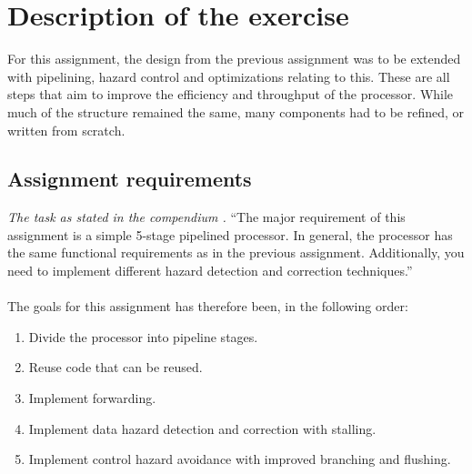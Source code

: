 \section{Description of the exercise}

For this assignment, the design from the previous assignment was to be extended
 with pipelining, hazard control and optimizations relating to this. These are all
 steps that aim to improve the efficiency and throughput of the processor. While
 much of the structure remained the same, many components had to be refined,
 or written from scratch.

\subsection{Assignment requirements}
\emph{The task as stated in the compendium \cite{compendium}.}\newline
``The major requirement of this assignment is a simple 5-stage pipelined
processor. In general, the processor has the same functional requirements as in
the previous assignment. Additionally, you need to implement different hazard
detection and correction techniques.''
\paragraph*{}
The goals for this assignment has therefore been, in the following order:
\begin{enumerate}
	\item Divide the processor into pipeline stages.
	\item Reuse code that can be reused.
	\item Implement forwarding.
	\item Implement data hazard detection and correction with stalling.
	\item Implement control hazard avoidance with improved branching and flushing.
\end{enumerate}
